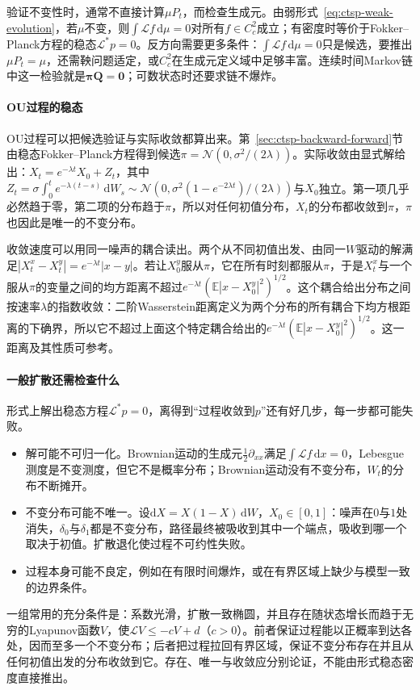 验证不变性时，通常不直接计算$\mu P_t$，而检查生成元。由弱形式~\eqref{eq:ctsp-weak-evolution}，若$\mu$不变，则$\int\mathcal Lf\,\mathrm d\mu=0$对所有$f\in C^2_c$成立；有密度时等价于Fokker--Planck方程的稳态$\mathcal L^*p=0$。反方向需要更多条件：$\int\mathcal Lf\,\mathrm d\mu=0$只是候选，要推出$\mu P_t=\mu$，还需鞅问题适定，或$C^2_c$在生成元定义域中足够丰富。连续时间Markov链中这一检验就是$\bm\pi\bm Q=\bm0$；可数状态时还要求链不爆炸。

\paragraph{OU过程的稳态}
OU过程可以把候选验证与实际收敛都算出来。第~\ref{sec:ctsp-backward-forward}节由稳态Fokker--Planck方程得到候选$\pi=\mathcal N(0,\sigma^2/(2\lambda))$。实际收敛由显式解给出：$X_t=e^{-\lambda t}X_0+Z_t$，其中$Z_t=\sigma\int_0^te^{-\lambda(t-s)}\,\mathrm dW_s\sim\mathcal N(0,\sigma^2(1-e^{-2\lambda t})/(2\lambda))$与$X_0$独立。第一项几乎必然趋于零，第二项的分布趋于$\pi$，所以对任何初值分布，$X_t$的分布都收敛到$\pi$，$\pi$也因此是唯一的不变分布。

收敛速度可以用同一噪声的耦合读出。两个从不同初值出发、由同一$W$驱动的解满足$|X^x_t-X^y_t|=e^{-\lambda t}|x-y|$。若让$X^y_0$服从$\pi$，它在所有时刻都服从$\pi$，于是$X^x_t$与一个服从$\pi$的变量之间的均方距离不超过$e^{-\lambda t}(\mathbb E|x-X^y_0|^2)^{1/2}$。这个耦合给出分布之间按速率$\lambda$的指数收敛：二阶Wasserstein距离定义为两个分布的所有耦合下均方根距离的下确界，所以它不超过上面这个特定耦合给出的$e^{-\lambda t}(\mathbb E|x-X^y_0|^2)^{1/2}$。这一距离及其性质可参考。

\paragraph{一般扩散还需检查什么}
形式上解出稳态方程$\mathcal L^*p=0$，离得到“过程收敛到$p$”还有好几步，每一步都可能失败。
\begin{itemize}
  \item 解可能不可归一化。Brownian运动的生成元$\frac12\partial_{xx}$满足$\int\mathcal Lf\,\mathrm dx=0$，Lebesgue测度是不变测度，但它不是概率分布；Brownian运动没有不变分布，$W_t$的分布不断摊开。
  \item 不变分布可能不唯一。设$\mathrm dX=X(1-X)\,\mathrm dW$，$X_0\in[0,1]$：噪声在$0$与$1$处消失，$\delta_0$与$\delta_1$都是不变分布，路径最终被吸收到其中一个端点，吸收到哪一个取决于初值。扩散退化使过程不可约性失败。
  \item 过程本身可能不良定，例如在有限时间爆炸，或在有界区域上缺少与模型一致的边界条件。
\end{itemize}
一组常用的充分条件是：系数光滑，扩散一致椭圆，并且存在随状态增长而趋于无穷的Lyapunov函数$V$，使$\mathcal LV\leq-cV+d$（$c>0$）。前者保证过程能以正概率到达各处，因而至多一个不变分布；后者把过程拉回有界区域，保证不变分布存在并且从任何初值出发的分布收敛到它。存在、唯一与收敛应分别论证，不能由形式稳态密度直接推出。

